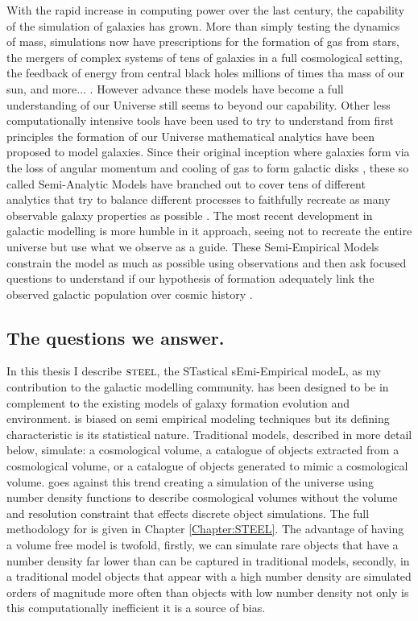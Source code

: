 With the rapid increase in computing power over the last century, the capability of the simulation of galaxies has grown. More than simply testing the dynamics of mass, simulations now have prescriptions for the formation of gas from stars, the mergers of complex systems of tens of galaxies in a full cosmological setting, the feedback of energy from central black holes millions of times tha mass of our sun, and more... \citep[e.g.,][]{McAlpine2015TheCatalogues, Pillepich2018FirstGalaxies}. However advance these models have become a full understanding of our Universe still seems to beyond our capability. Other less computationally intensive tools have been used to try to understand from first principles the formation of our Universe mathematical analytics have been proposed to model galaxies. Since their original inception where galaxies form via the loss of angular momentum and cooling of gas to form galactic disks \cite{Mo1998TheDiscs}, these so called Semi-Analytic Models have branched out to cover tens of different analytics that try to balance different processes to faithfully recreate as many observable galaxy properties as possible \citep[e.g.,][]{DeLucia2006TheGalaxies, Guo2011FromCosmology}. The most recent development in galactic modelling is more humble in it approach, seeing not to recreate the entire universe but use what we observe as a guide. These Semi-Empirical Models constrain the model as much as possible using observations and then ask focused questions to understand if our hypothesis of formation adequately link the observed galactic population over cosmic history \citep{Hopkins2010MERGERSMATTER, Zavala2012, Moster2013, Shankar2014, Moster2018Emerge10}.

\subsection{The questions we answer.}
In this thesis I describe $\textsc{steel}$, the STastical sEmi-Empirical modeL, as my contribution to the galactic modelling community. \steel has been designed to be in complement to the existing models of galaxy formation evolution and environment. \steel is biased on semi empirical modeling techniques but its defining characteristic is its statistical nature. Traditional models, described in more detail below, simulate: a cosmological volume, a catalogue of objects extracted from a cosmological volume, or a catalogue of objects generated to mimic a cosmological volume. \steel goes against this trend creating a simulation of the universe using number density functions to describe cosmological volumes without the volume and resolution constraint that effects discrete object simulations. The full methodology for \steel is given in Chapter \ref{Chapter:STEEL}. The advantage of having a volume free model is twofold, firstly, we can simulate rare objects that have a number density far lower than can be captured in traditional models, secondly, in a traditional model objects that appear with a high number density are simulated orders of magnitude more often than objects with low number density not only is this computationally inefficient it is a source of bias. 

